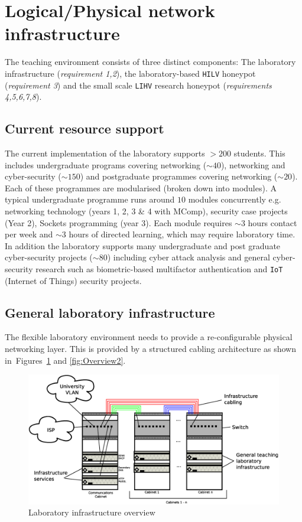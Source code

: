 \section{Logical/Physical network infrastructure}\label{LogicalDesign}

The teaching environment consists of three distinct components: The laboratory infrastructure (\textit{requirement 1,2}), the laboratory-based \texttt{HILV} honeypot (\textit{requirement 3}) and the small scale \texttt{LIHV} research honeypot (\textit{requirements 4,5,6,7,8}). 

\subsection{Current resource support}\label{ResourceSupport}
The current implementation of the laboratory supports $>200$ students. This includes undergraduate programs covering networking ($\sim40$), networking and cyber-security ($\sim150$) and postgraduate programmes covering networking ($\sim20$). Each of these programmes are modularised (broken down into modules).  A typical undergraduate programme runs around $10$ modules concurrently e.g. networking technology (years 1, 2, 3 \& 4 with MComp), security case projects (Year 2), Sockets programming (year 3). Each module requires $\sim3$ hours contact per week and $\sim3$ hours of directed learning, which may require laboratory time. In addition the laboratory supports many undergraduate and post graduate cyber-security projects ($\sim80$) including cyber attack analysis and general cyber-security research such as biometric-based multifactor authentication and \texttt{IoT} (Internet of Things) security projects.

\subsection{General laboratory infrastructure}
The flexible laboratory environment needs to provide a re-configurable physical networking layer. This is provided by a structured cabling architecture as shown in~Figures~\ref{fig:Overview1} and \ref{fig:Overview2}. 

\begin{figure}[h]
\begin{center}
	\includegraphics[scale=0.4]{Images/Infrastructure.eps}
\caption{Laboratory infrastructure overview}
\label{fig:Overview1}
\end{center}
\end{figure}

